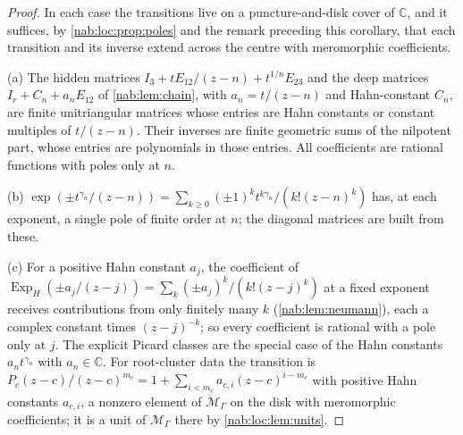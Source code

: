 \documentclass[11pt,letterpaper]{article}
\theoremstyle{definition}
\theoremstyle{remark}
\newcommand{\C}{\mathbb C}
\newcommand{\MM}{\mathscr M_\Gamma}
\numberwithin{equation}{section}
\begin{document}
\begin{proof}
In each case the transitions live on a puncture-and-disk cover of $\C$, and it
suffices, by \cref{nab:loc:prop:poles} and the remark preceding this corollary,
that each transition and its inverse extend across the centre with meromorphic
coefficients.

(a) The hidden matrices $I_3+tE_{12}/(z-n)+t^{1/n}E_{23}$ and the deep
matrices $I_r+C_n+a_nE_{12}$ of \cref{nab:lem:chain}, with
$a_n=t/(z-n)$ and Hahn-constant $C_n$, are finite unitriangular matrices
whose entries are Hahn constants or constant multiples of $t/(z-n)$. Their
inverses are finite geometric sums of the nilpotent part, whose entries are
polynomials in those entries. All coefficients are rational functions with
poles only at $n$.

(b) $\exp(\pm t^{\gamma_n}/(z-n))=\sum_{k\geq0}(\pm1)^kt^{k\gamma_n}/(k!(z-n)^k)$
has, at each exponent, a single pole of finite order at $n$; the diagonal
matrices are built from these.

(c) For a positive Hahn constant $a_j$, the coefficient of
$\operatorname{Exp}_H(\pm a_j/(z-j))=\sum_k(\pm a_j)^k/(k!(z-j)^k)$ at a fixed
exponent receives contributions from only finitely many $k$
(\cref{nab:lem:neumann}), each a complex constant times $(z-j)^{-k}$; so every
coefficient is rational with a pole only at $j$. The explicit Picard classes are
the special case of the Hahn constants $a_nt^{\gamma_n}$ with $a_n\in\C$. For
root-cluster data the
transition is $P_c(z-c)/(z-c)^{m_c}=1+\sum_{i<m_c}a_{c,i}(z-c)^{i-m_c}$ with
positive Hahn constants $a_{c,i}$, a nonzero element of $\MM$ on the disk with
meromorphic coefficients; it is a unit of $\MM$ there by
\cref{nab:loc:lem:units}.
\end{proof}
\end{document}
